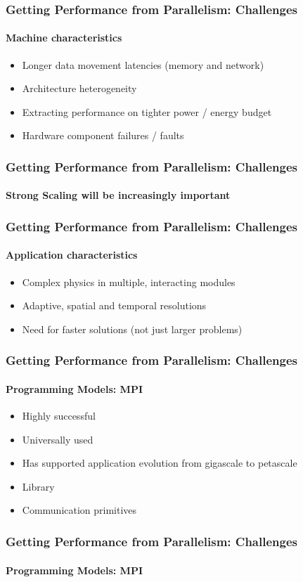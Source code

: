 \begin{frame}[fragile]
  \frametitle{Getting Performance from Parallelism: Challenges}
  \framesubtitle{Machine characteristics}
  \begin{itemize}
  \item Longer data movement latencies (memory and network)
  \item Architecture heterogeneity
  \item Extracting performance on tighter power / energy budget
  \item Hardware component failures / faults
  \end{itemize}
\end{frame}


\begin{frame}[fragile]
  \frametitle{Getting Performance from Parallelism: Challenges}
  \framesubtitle{Strong Scaling will be increasingly important}
  \begin{itemize}
  \end{itemize}
\end{frame}


\begin{frame}[fragile]
  \frametitle{Getting Performance from Parallelism: Challenges}
  \framesubtitle{Application characteristics}
  \begin{itemize}
  \item Complex physics in multiple, interacting modules
  \item Adaptive, spatial and temporal resolutions
  \item Need for faster solutions (not just larger problems)
  \end{itemize}
\end{frame}


\begin{frame}[fragile]
\frametitle{Getting Performance from Parallelism: Challenges}
\framesubtitle{Programming Models: MPI}
  \begin{itemize}
    \item Highly successful
    \item Universally used
    \item Has supported application evolution from gigascale to petascale
  \end{itemize}
  \begin{itemize}
    \item Library
    \item Communication primitives
  \end{itemize}
\end{frame}


\begin{frame}[fragile]
\frametitle{Getting Performance from Parallelism: Challenges}
\framesubtitle{Programming Models: MPI}
  \begin{itemize}
  \end{itemize}
\end{frame}

